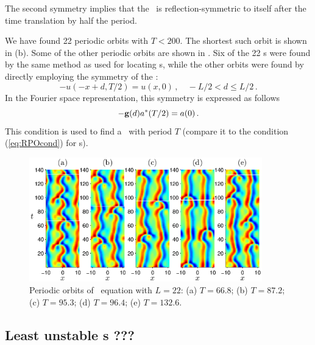 The second symmetry implies that the \rpo\ is reflection-\-sym\-metric
to itself after the time translation by half the period.

We have found 22 periodic orbits 
with $T < 200$.  The
shortest such orbit is shown in (b).  Some
of the other periodic orbits are shown in . Six
of the 22 \po s were found by the same method as used for locating
\rpo s, while the other orbits were found by directly employing the
symmetry of the \po:
\[ -u(-x+d,T/2) = u(x,0)\,, \quad -L/2 < d \leq L/2\,.\]
In the Fourier space representation, this symmetry is expressed as
follows
\[
 -{\bf g}(d)a^\ast(T/2) = a(0)\,.
\]
This condition is used to find a \po\ with period $T$ (compare it to
the condition (\ref{eq:RPOcond}) for \rpo s). 


\begin{figure}[t]
\begin{center}
\includegraphics[width=0.9\textwidth]{figs/ks22rposPO.eps}
\end{center}
\caption{Periodic orbits of \KS\ equation with $L = 22$: (a) $T =
66.8$; (b) $T = 87.2$; (c) $T = 95.3$; (d) $T = 96.4$; (e) $T =
132.6$.}\label{f:ks22rposPO}
\end{figure}


\subsection{Least unstable \rpo s ???}

